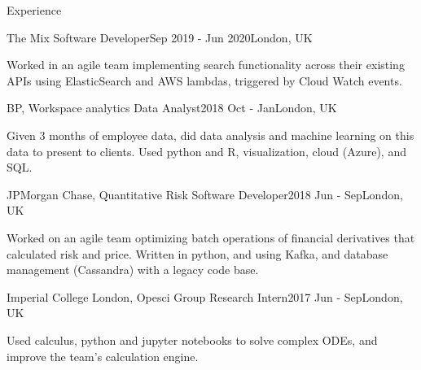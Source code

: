 \documentclass[10pt]{resume} %
\begin{document}
\begin{rSection}{Experience}

  \begin{rSubsection}{The Mix}
    {Software Developer}{Sep 2019 - Jun 2020}{London, UK}
  \item Worked in an agile team implementing search functionality across their
    existing APIs using ElasticSearch and AWS lambdas, triggered by Cloud Watch
    events.
  \end{rSubsection}


  \begin{rSubsection}{BP, Workspace analytics}
    {Data Analyst}{2018 Oct - Jan}{London, UK}
  \item Given 3 months of employee data, did data analysis and machine learning
    on this data to present to clients. Used python and R, visualization, cloud
    (Azure), and SQL.
  \end{rSubsection}


  \begin{rSubsection}{JPMorgan Chase, Quantitative Risk}
    {Software Developer}{2018 Jun - Sep}{London, UK}
    \item Worked on an agile team optimizing batch operations of financial
      derivatives that calculated risk and price. Written in python, and
      using Kafka, and database management (Cassandra) with a legacy code base.
  \end{rSubsection}


  \begin{rSubsection}{Imperial College London, Opesci Group}
    {Research Intern}{2017 Jun - Sep}{London, UK}
      \item Used calculus, python and jupyter notebooks to solve complex ODEs,
        and improve the team's calculation engine.
  \end{rSubsection}


\end{rSection}
\end{document}
